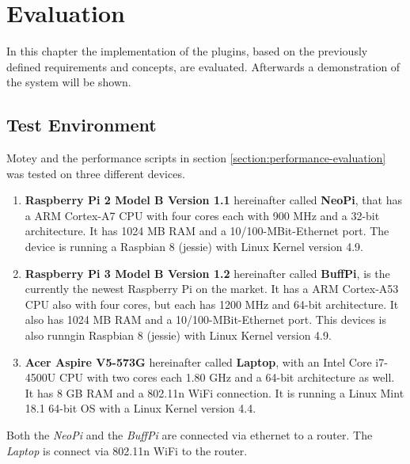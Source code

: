 \chapter{Evaluation}\label{chapter:evaluation}
In this chapter the implementation of the plugins, based on the previously defined requirements and concepts, are evaluated.
Afterwards a demonstration of the system will be shown.

\section{Test Environment}
\label{section:test-environment}
Motey and the performance scripts in section \ref{section:performance-evaluation} was tested on three different devices.
\begin{enumerate}
  \item \textbf{Raspberry Pi 2 Model B Version 1.1} hereinafter called \textbf{NeoPi}, that has a ARM Cortex-A7 \ac{CPU} with four cores each with 900 MHz and a 32-bit architecture. It has 1024 MB \ac{RAM} and a 10/100-MBit-Ethernet port. The device is running a Raspbian 8 (jessie) with Linux Kernel version 4.9.
  \item \textbf{Raspberry Pi 3 Model B Version 1.2} hereinafter called \textbf{BuffPi}, is the currently the newest Raspberry Pi on the market. It has a ARM Cortex-A53 \ac{CPU} also with four cores, but each has 1200 MHz and 64-bit architecture. It also has 1024 MB \ac{RAM} and a 10/100-MBit-Ethernet port.  This devices is also runngin Raspbian 8 (jessie) with Linux Kernel version 4.9.
  \item \textbf{Acer Aspire V5-573G} hereinafter called \textbf{Laptop}, with an Intel Core i7-4500U \ac{CPU} with two cores each 1.80 GHz and a 64-bit architecture as well. It has 8 GB \ac{RAM} and a 802.11n WiFi connection. It is running a Linux Mint 18.1  64-bit \ac{OS} with a Linux Kernel version 4.4.
\end{enumerate}

Both the \textit{NeoPi} and the \textit{BuffPi} are connected via ethernet to a router.
The \textit{Laptop} is connect via 802.11n WiFi to the router.

